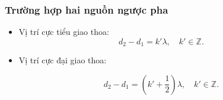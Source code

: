 \subsubsection{Trường hợp hai nguồn ngược pha}
\begin{itemize}
	\item Vị trí cực tiểu giao thoa:
	\begin{equation*}
		d_2-d_1 = k'\lambda,\quad k' \in \mathbb{Z}.
	\end{equation*}
	
	\item Vị trí cực đại giao thoa:
	
	\begin{equation*}
		d_2-d_1 = \left(k'+ \dfrac{1}{2}\right) \lambda,\quad k' \in \mathbb{Z}.
	\end{equation*}
	
\end{itemize}
